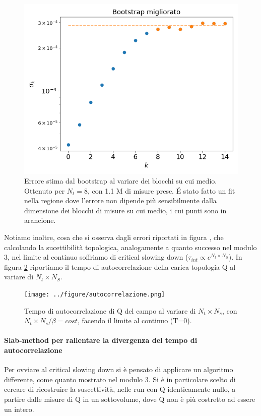 \documentclass[a4paper, 12pt]{article}
\begin{document}
\begin{figure}
\includegraphics[width=\linewidth]{../figure/bootstrap_migliorato8.png}
\caption{Errore stima dal bootstrap al variare dei blocchi su cui medio.
Ottenuto per $N_t=8$, con 1.1 M di misure prese.
\'E stato fatto un fit nella regione dove l'errore non dipende più sensibilmente
dalla dimensione dei blocchi di misure su cui medio, i cui punti sono in arancione.}
\label{U1gaugefield_bootstrap_migliorato}
\end{figure}


Notiamo inoltre, cosa che si osserva dagli errori riportati in figura
\label{U1gaugefield_suscettivity}, che calcolando la sucettibilità topologica,
analogamente a quanto successo nel modulo 3, nel limite al continuo soffriamo
di critical slowing down ($\tau_{int} \propto e^{N_t \times N_S}$).
In figura \ref{U1gaugefield_autocorrelazione} riportiamo il tempo di autocorrelazione
della carica topologia Q al variare di $N_t \times N_S$.

\begin{figure}
\texttt{[image: ../figure/autocorrelazione.png]}
\caption{Tempo di autocorrelazione di Q del campo al variare di $N_t \times N_s$,
con $N_t \times N_s / \beta = cost$, facendo il limite al continuo (T=0).}
\label{U1gaugefield_autocorrelazione}
\end{figure}

\paragraph{Slab-method per rallentare la divergenza del tempo di autocorrelazione}
Per ovviare al critical slowing down si è pensato di applicare un algoritmo
differente, come quanto mostrato nel modulo 3.
Si è in particolare scelto di cercare di ricostruire la suscettività, nelle run
con Q identicamente nullo, a partire dalle misure di Q in un sottovolume, dove
Q non è più costretto ad essere un intero.
\end{document}
